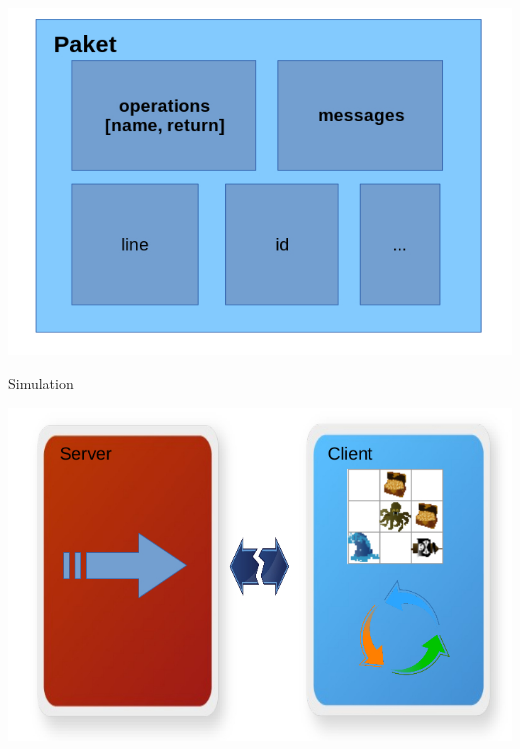 \begin{frame}
	\begin{center}
		\includegraphics[scale=0.5]{simulation/Pakete2.jpg}
	\end{center}
\end{frame}

\begin{frame}
	Simulation
	\begin{center}
		\includegraphics[scale=0.5]{simulation/Simulation1.jpg}
	\end{center}
\end{frame}


